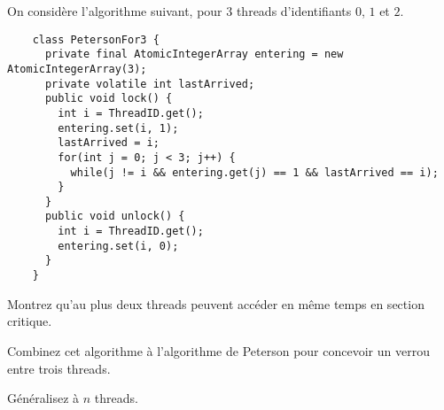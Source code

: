 
\begingroup

\begin{exercice}
  \label{exo:locks/filter}

  On considère l'algorithme suivant, pour $3$ threads d'identifiants $0$, $1$ et $2$. 

  \begin{lstlisting}
    class PetersonFor3 {
      private final AtomicIntegerArray entering = new AtomicIntegerArray(3);
      private volatile int lastArrived;
      public void lock() {
        int i = ThreadID.get();
        entering.set(i, 1);
        lastArrived = i;
        for(int j = 0; j < 3; j++) {
          while(j != i && entering.get(j) == 1 && lastArrived == i);
        }
      }
      public void unlock() {
        int i = ThreadID.get();
        entering.set(i, 0);
      }
    }
  \end{lstlisting}

  \begin{question}
  \item Montrez qu'au plus deux threads peuvent accéder en même temps en section critique.
  \item Combinez cet algorithme à l'algorithme de Peterson pour concevoir un verrou entre trois threads.
  \item Généralisez à $n$ threads.
  \end{question}
  
\end{exercice}

\endgroup
\endinput
